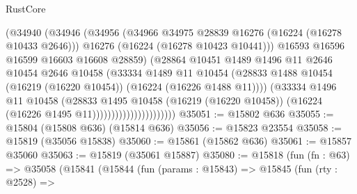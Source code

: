 \begin{lexlean}{RustCore}
\begin{coremodule}
                                    (@34940
                                      (@34946
                                        (@34956
                                          (@34966
                                            @34975
                                            @28839
                                            @16276
                                            (@16224 (@16278 @10433 @2646)))
                                          @16276
                                          (@16224 (@16278 @10423 @10441)))
                                        @16593
                                        @16596
                                        @16599
                                        @16603
                                        @16608
                                        @28859)
                                      (@28864
                                        @10451
                                        @1489
                                        @1496
                                        @11
                                        @2646
                                        @10454
                                        @2646
                                        @10458
                                        (@33334
                                          @1489
                                          @11
                                          @10454
                                          (@28833
                                            @1488
                                            @10454
                                            (@16219 (@16220 @10454))
                                            (@16224 (@16226 @1488 @11))))
                                        (@33334
                                          @1496
                                          @11
                                          @10458
                                          (@28833
                                            @1495
                                            @10458
                                            (@16219 (@16220 @10458))
                                            (@16224 (@16226 @1495 @11))))))))))))))))))))))
@35051 := @15802 @636
@35055 := @15804 (@15808 @636) (@15814 @636)
@35056 := @15823 @23554
@35058 := @15819 (@35056 @15838)
@35060 := @15861 (@15862 @636)
@35061 := @15857 @35060
@35063 := @15819 (@35061 @15887)
@35080 := @15818
    (fun (fn : @63) =>
    @35058
      (@15841
        (@15844
          (fun (params : @15843) =>
          @15845
            (fun (rty : @2528) =>

\end{coremodule}
\end{lexlean}
